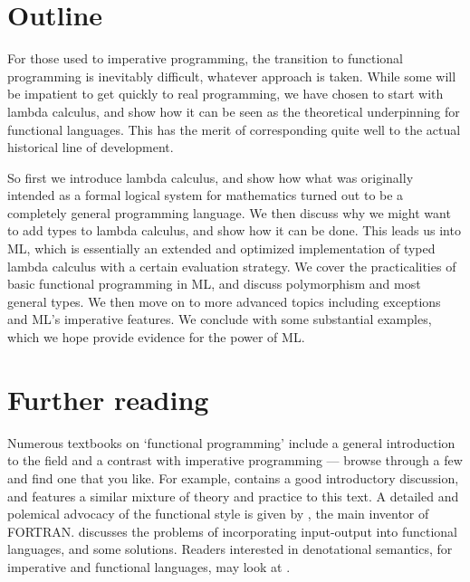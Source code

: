 \section{Outline}

For those used to imperative programming, the transition to functional
programming is inevitably difficult, whatever approach is taken. While some
will be impatient to get quickly to real programming, we have chosen to start
with lambda calculus, and show how it can be seen as the theoretical
underpinning for functional languages. This has the merit of corresponding
quite well to the actual historical line of development.

So first we introduce lambda calculus, and show how what was originally
intended as a formal logical system for mathematics turned out to be a
completely general programming language. We then discuss why we might want to
add types to lambda calculus, and show how it can be done. This leads us into
ML, which is essentially an extended and optimized implementation of typed
lambda calculus with a certain evaluation strategy. We cover the practicalities
of basic functional programming in ML, and discuss polymorphism and most
general types. We then move on to more advanced topics including exceptions and
ML's imperative features. We conclude with some substantial examples, which we
hope provide evidence for the power of ML.

\section*{Further reading}

Numerous textbooks on `functional programming' include a general introduction
to the field and a contrast with imperative programming --- browse through a
few and find one that you like. For example,  contains a
good introductory discussion, and features a similar mixture of theory and
practice to this text. A detailed and polemical advocacy of the functional
style is given by , the main inventor of FORTRAN.
 discusses the problems of incorporating input-output into
functional languages, and some solutions. Readers interested in denotational
semantics, for imperative and functional languages, may look at
.
